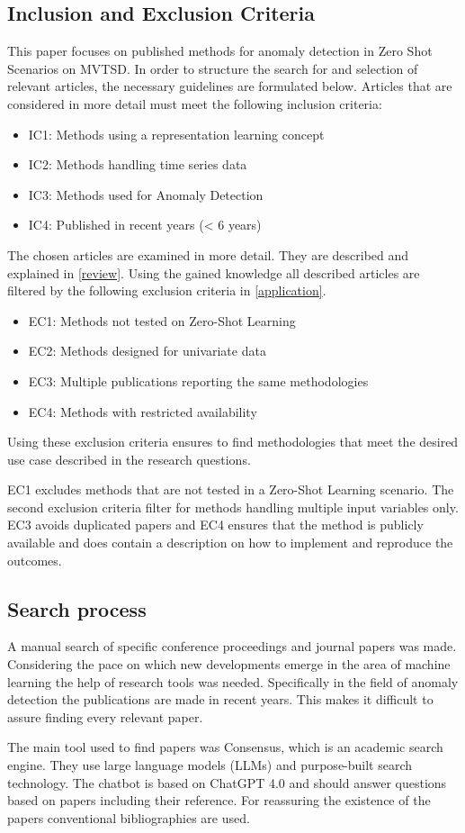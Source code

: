 \subsection{Inclusion and Exclusion Criteria}\label{criteria}
This paper focuses on published methods for anomaly detection in Zero Shot Scenarios on MVTSD. In order to structure the search for and selection of relevant articles, the necessary guidelines are formulated below. Articles that are considered in more detail must meet the following inclusion criteria:
\begin{itemize}
\item IC1: Methods using a representation learning concept
\item IC2: Methods handling time series data
\item IC3: Methods used for Anomaly Detection
\item IC4: Published in recent years (< 6 years)
\end{itemize}
The chosen articles are examined in more detail. They are described and explained in \autoref{review}. Using the gained knowledge all described articles are filtered by the following exclusion criteria in \autoref{application}.
\begin{itemize}
\item EC1: Methods not tested on Zero-Shot Learning
\item EC2: Methods designed for univariate data
\item EC3: Multiple publications reporting the same methodologies
\item EC4: Methods with restricted availability
\end{itemize}
Using these exclusion criteria ensures to find methodologies that meet the desired use case described in the research questions.

EC1 excludes methods that are not tested in a Zero-Shot Learning scenario. The second exclusion criteria filter for methods handling multiple input variables only. EC3 avoids duplicated papers and EC4 ensures that the method is publicly available and does contain a description on how to implement and reproduce the outcomes.
\subsection{Search process}
A manual search of specific conference proceedings and journal papers was made. Considering the pace on which new developments emerge in the area of machine learning the help of research tools was needed. Specifically in the field of anomaly detection the publications are made in recent years. This makes it difficult to assure finding every relevant paper.

The main tool used to find papers was Consensus, which is an academic search engine. They use large language models (LLMs) and purpose-built search technology. The chatbot is based on ChatGPT 4.0 and should answer questions based on papers including their reference. For reassuring the existence of the papers conventional bibliographies are used.
